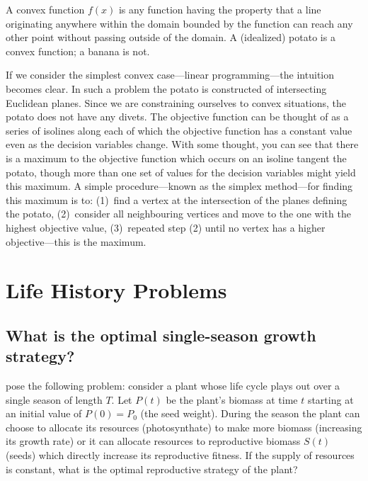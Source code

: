\documentclass{article}
\begin{document}

A convex function $f(x)$ is any function having the property that a line originating anywhere within the domain bounded by the function can reach any other point without passing outside of the domain. A (idealized) potato is a convex function; a banana is not.

If we consider the simplest convex case---linear programming---the intuition becomes clear. In such a problem the potato is constructed of intersecting Euclidean planes. Since we are constraining ourselves to convex situations, the potato does not have any divets. The objective function can be thought of as a series of isolines along each of which the objective function has a constant value even as the decision variables change. With some thought, you can see that there is a maximum to the objective function which occurs on an isoline tangent the potato, though more than one set of values for the decision variables might yield this maximum. A simple procedure---known as the simplex method---for finding this maximum is to:
(1)~find a vertex at the intersection of the planes defining the potato,
(2)~consider all neighbouring vertices and move to the one with the highest objective value,
(3)~repeated step (2) until no vertex has a higher objective---this is the maximum.

\section{Life History Problems}
\label{sec:problems}


\subsection{What is the optimal single-season growth strategy?}
\label{sec:mirmirani1978-single}

\citet{mirmirani_competition_1978} pose the following problem: consider a plant whose life cycle plays out over a single season of length $T$. Let $P(t)$ be the plant's biomass at time $t$ starting at an initial value of $P(0)=P_0$ (the seed weight). During the season the plant can choose to allocate its resources (photosynthate) to make more biomass (increasing its growth rate) or it can allocate resources to reproductive biomass $S(t)$ (seeds) which directly increase its reproductive fitness. If the supply of resources is constant, what is the optimal reproductive strategy of the plant?
\end{document}
